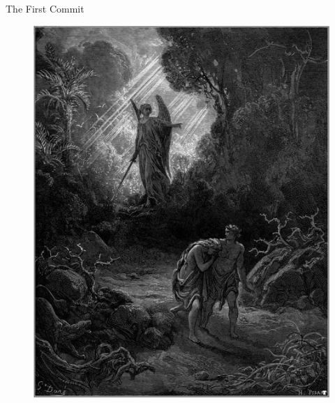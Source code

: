\documentclass[12pt,xcolor=x11names]{beamer}
\begin{document}
\begin{frame}{The First Commit}
    \begin{figure}
        \centering \includegraphics[height=0.75\textheight]{images/castout.png}
    \end{figure}
\end{frame}
\end{document}
